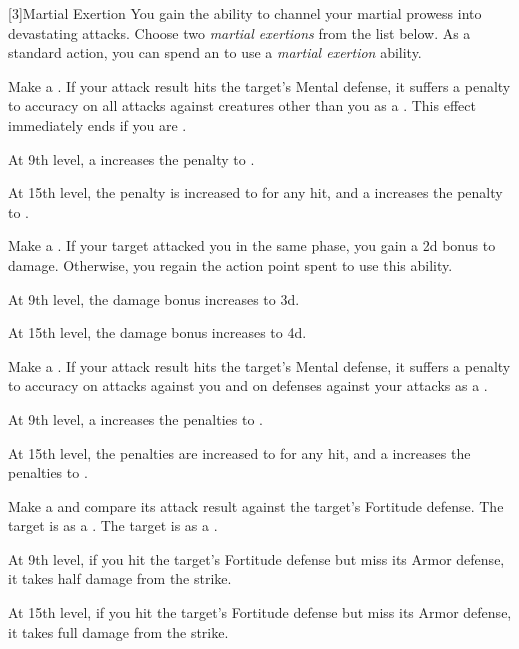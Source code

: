         [3]{Martial Exertion}
        You gain the ability to channel your martial prowess into devastating attacks.
        Choose two \textit{martial exertions} from the list below.
        As a standard action, you can spend an  to use a \textit{martial exertion} ability.
        {
             Make a .
            If your attack result hits the target's Mental defense, it suffers a  penalty to accuracy on all attacks against creatures other than you as a .
            This effect immediately ends if you are .

            At 9th level, a  increases the penalty to .
            \par At 15th level, the penalty is increased to  for any hit, and a  increases the penalty to .

             Make a .
            If your target attacked you in the same phase, you gain a \plus2d bonus to damage.
            Otherwise, you regain the action point spent to use this ability.

            At 9th level, the damage bonus increases to \plus3d.
            \par At 15th level, the damage bonus increases to \plus4d.

             Make a .
            If your attack result hits the target's Mental defense, it suffers a  penalty to accuracy on attacks against you and on defenses against your attacks as a .

            At 9th level, a  increases the penalties to .
            \par At 15th level, the penalties are increased to  for any hit, and a  increases the penalties to .

             Make a  and compare its attack result against the target's Fortitude defense.
             The target is \sickened as a .
             The target is \nauseated as a .

            At 9th level, if you hit the target's Fortitude defense but miss its Armor defense, it takes half damage from the strike.
            \par At 15th level, if you hit the target's Fortitude defense but miss its Armor defense, it takes full damage from the strike.

}
